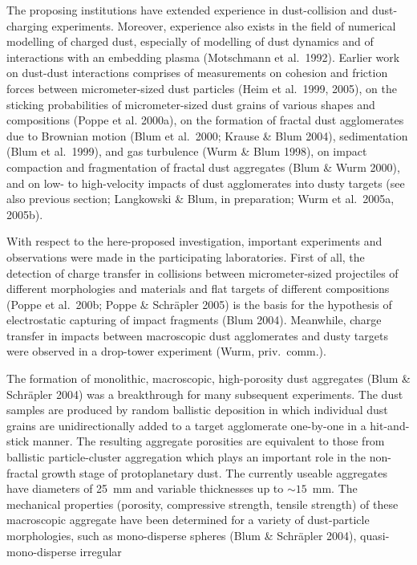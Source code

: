 The proposing institutions have extended experience in
dust-collision and dust-charging experiments. Moreover, experience
also exists in the field of numerical modelling of charged dust,
especially of modelling of dust dynamics and of interactions with
an embedding plasma (Motschmann et al.~1992). Earlier work on
dust-dust interactions comprises of measurements on cohesion and
friction forces between micrometer-sized dust particles (Heim et
al.~1999, 2005), on the sticking probabilities of micrometer-sized
dust grains of various shapes and compositions (Poppe et al.
2000a), on the formation of fractal dust agglomerates due to
Brownian motion (Blum et al.~2000; Krause \& Blum 2004),
sedimentation (Blum et al.~1999), and gas turbulence (Wurm \& Blum
1998), on impact compaction and fragmentation of fractal dust
aggregates (Blum \& Wurm 2000), and on low- to high-velocity
impacts of dust agglomerates into dusty targets (see also previous
section; Langkowski \& Blum, in preparation; Wurm et al.~2005a,
2005b).
\par
With respect to the here-proposed investigation, important
experiments and observations were made in the participating
laboratories. First of all, the detection of charge transfer in
collisions between micrometer-sized projectiles of different
morphologies and materials and flat targets of different
compositions (Poppe et al.~200b; Poppe \& Schr\"apler 2005) is the
basis for the hypothesis of electrostatic capturing of impact
fragments (Blum 2004). Meanwhile, charge transfer in impacts
between macroscopic dust agglomerates and dusty targets were
observed in a drop-tower experiment (Wurm, priv.\ comm.).
\par
The formation of monolithic, macroscopic, high-porosity dust
aggregates (Blum \& Schr\"ap\-ler 2004) was a breakthrough for
many subsequent experiments. The dust samples are produced by
random ballistic deposition in which individual dust grains are
unidirectionally added to a target agglomerate one-by-one in a
hit-and-stick manner. The resulting aggregate porosities are
equivalent to those from ballistic particle-cluster aggregation
which plays an important role in the non-fractal growth stage of
protoplanetary dust. The currently useable aggregates have
diameters of 25~mm and variable thicknesses up to $\sim 15$~mm.
The mechanical properties (porosity, compressive strength, tensile
strength) of these macroscopic aggregate have been determined for
a variety of dust-particle morphologies, such as mono-disperse
spheres (Blum \& Schr\"apler 2004), quasi-mono-disperse irregular
